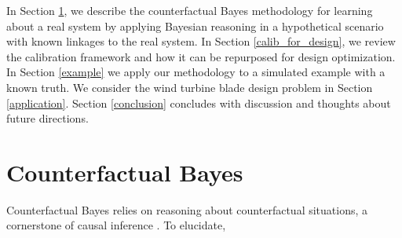 \documentclass[twocolumn,10pt]{asme2ej}
\begin{document}
%
In Section \ref{counterfactual_bayes}, we describe the counterfactual Bayes methodology for learning about a real system by applying Bayesian reasoning in a hypothetical scenario with known linkages to the real system.
%
In Section \ref{calib_for_design}, we review the calibration framework and how it can be repurposed for design optimization. 
%
In Section \ref{example} we apply our methodology to a simulated example with a known truth. We consider the wind turbine blade design problem in Section \ref{application}.
%
%
Section \ref{conclusion} concludes with discussion and thoughts about future directions.
%

%
\section{Counterfactual Bayes}\label{counterfactual_bayes}
%
Counterfactual Bayes relies on reasoning about counterfactual situations, a cornerstone of causal inference \cite{Rubin1974}.
%
To elucidate, 
\end{document}
